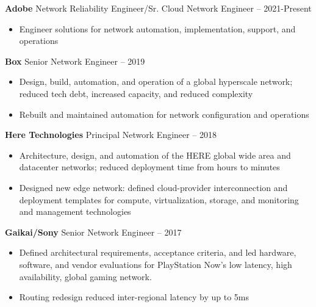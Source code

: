 \documentclass[11pt]{article}
\newcommand{\job}[3]{
    \begingroup
        \textbf{\small#1} \hfill \small#2 \--- \color{black!70}\small{#3}
    \endgroup
}
\newcommand{\spacevv}{
    \vspace{2mm}
}
\begin{document}
\begin{paracol}{2}
{      \job{Adobe}{Network Reliability Engineer/Sr. Cloud Network Engineer}{2021\--Present}
      \begin{itemize}
        \item Engineer solutions for network automation, implementation, support, and operations
      \end{itemize}
      \spacevv{}

      \job{Box}{Senior Network Engineer}{2019}
      \begin{itemize}
        \item Design, build, automation, and operation of a global hyperscale network; reduced tech debt, increased
            capacity, and reduced complexity
        \item Rebuilt and maintained automation for network configuration and operations
      \end{itemize}

    \job{Here Technologies}{Principal Network Engineer}{2018}
    \begin{itemize}
        \item Architecture, design, and automation of the HERE global wide area and datacenter networks; reduced
            deployment time from hours to minutes
        \item Designed new edge network: defined cloud-provider interconnection and deployment templates for compute,
            virtualization, storage, and monitoring and management technologies
    \end{itemize}
    \spacevv{}

    \job{Gaikai/Sony}{Senior Network Engineer}{2017}
    \begin{itemize}
        \item Defined architectural requirements, acceptance criteria, and led hardware, software, and vendor
            evaluations for PlayStation Now's low latency, high availability, global gaming network.
        \item Routing redesign reduced inter-regional latency by up to 5ms
    \end{itemize}
    \spacevv{}

}
\end{paracol}
\end{document}

